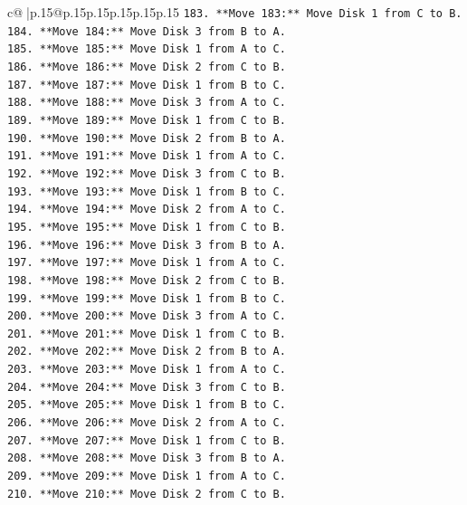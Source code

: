 \documentclass{article}
\begin{document}
{\begin{supertabular}{c@{$\;$}|p{.15\linewidth}@{}p{.15\linewidth}p{.15\linewidth}p{.15\linewidth}p{.15\linewidth}p{.15\linewidth}}
{{{\texttt{183. **Move 183:** Move Disk 1 from C to B.} \\
\texttt{184. **Move 184:** Move Disk 3 from B to A.} \\
\texttt{185. **Move 185:** Move Disk 1 from A to C.} \\
\texttt{186. **Move 186:** Move Disk 2 from C to B.} \\
\texttt{187. **Move 187:** Move Disk 1 from B to C.} \\
\texttt{188. **Move 188:** Move Disk 3 from A to C.} \\
\texttt{189. **Move 189:** Move Disk 1 from C to B.} \\
\texttt{190. **Move 190:** Move Disk 2 from B to A.} \\
\texttt{191. **Move 191:** Move Disk 1 from A to C.} \\
\texttt{192. **Move 192:** Move Disk 3 from C to B.} \\
\texttt{193. **Move 193:** Move Disk 1 from B to C.} \\
\texttt{194. **Move 194:** Move Disk 2 from A to C.} \\
\texttt{195. **Move 195:** Move Disk 1 from C to B.} \\
\texttt{196. **Move 196:** Move Disk 3 from B to A.} \\
\texttt{197. **Move 197:** Move Disk 1 from A to C.} \\
\texttt{198. **Move 198:** Move Disk 2 from C to B.} \\
\texttt{199. **Move 199:** Move Disk 1 from B to C.} \\
\texttt{200. **Move 200:** Move Disk 3 from A to C.} \\
\texttt{201. **Move 201:** Move Disk 1 from C to B.} \\
\texttt{202. **Move 202:** Move Disk 2 from B to A.} \\
\texttt{203. **Move 203:** Move Disk 1 from A to C.} \\
\texttt{204. **Move 204:** Move Disk 3 from C to B.} \\
\texttt{205. **Move 205:** Move Disk 1 from B to C.} \\
\texttt{206. **Move 206:** Move Disk 2 from A to C.} \\
\texttt{207. **Move 207:** Move Disk 1 from C to B.} \\
\texttt{208. **Move 208:** Move Disk 3 from B to A.} \\
\texttt{209. **Move 209:** Move Disk 1 from A to C.} \\
\texttt{210. **Move 210:** Move Disk 2 from C to B.} \\
}}}
\end{supertabular}}
\end{document}
